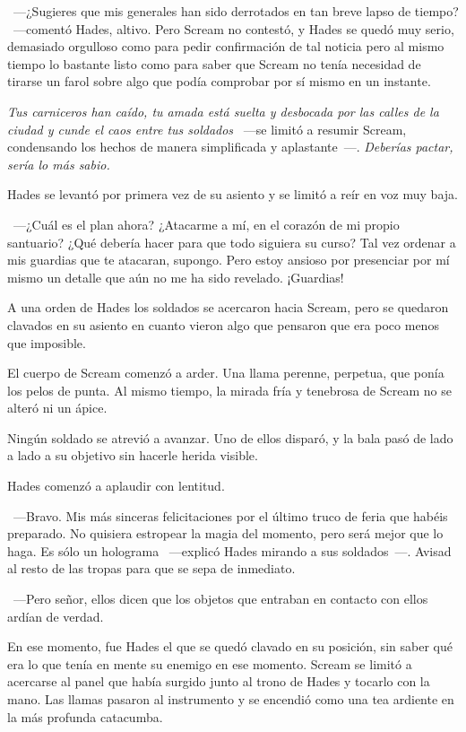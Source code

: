 \parbreak
~---¿Sugieres que mis generales han sido derrotados en tan breve lapso de tiempo? ~---comentó Hades, altivo. Pero Scream no contestó, y Hades se quedó muy serio, demasiado orgulloso como para pedir confirmación de tal noticia pero al mismo tiempo lo bastante listo como para saber que Scream no tenía necesidad de tirarse un farol sobre algo que podía comprobar por sí mismo en un instante.

\emph{Tus carniceros han caído, tu amada está suelta y desbocada por las calles de la ciudad y cunde el caos entre tus soldados} ~---se limitó a resumir Scream, condensando los hechos de manera simplificada y aplastante~---. \emph{Deberías pactar, sería lo más sabio.}

Hades se levantó por primera vez de su asiento y se limitó a reír en voz muy baja.

~---¿Cuál es el plan ahora? ¿Atacarme a mí, en el corazón de mi propio santuario? ¿Qué debería hacer para que todo siguiera su curso? Tal vez ordenar a mis guardias que te atacaran, supongo. Pero estoy ansioso por presenciar por mí mismo un detalle que aún no me ha sido revelado. ¡Guardias!

A una orden de Hades los soldados se acercaron hacia Scream, pero se quedaron clavados en su asiento en cuanto vieron algo que pensaron que era poco menos que imposible.

El cuerpo de Scream comenzó a arder. Una llama perenne, perpetua, que ponía los pelos de punta. Al mismo tiempo, la mirada fría y tenebrosa de Scream no se alteró ni un ápice.

Ningún soldado se atrevió a avanzar. Uno de ellos disparó, y la bala pasó de lado a lado a su objetivo sin hacerle herida visible.

Hades comenzó a aplaudir con lentitud.

~---Bravo. Mis más sinceras felicitaciones por el último truco de feria que habéis preparado. No quisiera estropear la magia del momento, pero será mejor que lo haga. Es sólo un holograma ~---explicó Hades mirando a sus soldados~---. Avisad al resto de las tropas para que se sepa de inmediato.

~---Pero señor, ellos dicen que los objetos que entraban en contacto con ellos ardían de verdad.

En ese momento, fue Hades el que se quedó clavado en su posición, sin saber qué era lo que tenía en mente su enemigo en ese momento. Scream se limitó a acercarse al panel que había surgido junto al trono de Hades y tocarlo con la mano. Las llamas pasaron al instrumento y se encendió como una tea ardiente en la más profunda catacumba.

